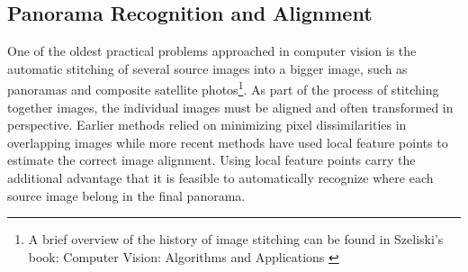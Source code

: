 \documentclass{article}
\begin{document}
\subsection{Panorama Recognition and Alignment}
One of the oldest practical problems approached in computer vision is 
the automatic stitching of several source images into a bigger image, 
such as panoramas and composite satellite photos\footnote{A brief 
overview of the history of image stitching can be found in Szeliski's 
book: Computer Vision: Algorithms and Applications \cite{szeliski2010}}.  
As part of the process of stitching together images, the individual 
images must be aligned and often transformed in perspective. Earlier 
methods relied on minimizing pixel dissimilarities in overlapping images 
while more recent methods have used local feature points to estimate the 
correct image alignment. Using local feature points carry the additional 
advantage that it is feasible to automatically recognize where each 
source image belong in the final panorama.
\end{document}
